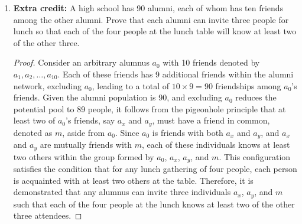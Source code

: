 \documentclass[11pt]{article}
\begin{document}
\begin{enumerate}
    \item {\bf Extra credit:} A high school has 90 alumni, each of whom has ten friends among the other alumni. Prove that each alumni can invite three people for lunch so that each of the four people at the lunch table will know at least two of the other three.

        \begin{proof}
            Consider an arbitrary alumnus \(a_0\) with 10 friends denoted by \(a_1, a_2, \ldots, a_{10}\). Each of these friends has 9 additional friends within the alumni network, excluding \(a_0\), leading to a total of \(10 \times 9 = 90\) friendships among \(a_0\)'s friends. Given the alumni population is 90, and excluding \(a_0\) reduces the potential pool to 89 people, it follows from the pigeonhole principle that at least two of \(a_0\)'s friends, say \(a_x\) and \(a_y\), must have a friend in common, denoted as \(m\), aside from \(a_0\). Since \(a_0\) is friends with both \(a_x\) and \(a_y\), and \(a_x\) and \(a_y\) are mutually friends with \(m\), each of these individuals knows at least two others within the group formed by \(a_0\), \(a_x\), \(a_y\), and \(m\). This configuration satisfies the condition that for any lunch gathering of four people, each person is acquainted with at least two others at the table. Therefore, it is demonstrated that any alumnus can invite three individuals \(a_x\), \(a_y\), and \(m\) such that each of the four people at the lunch knows at least two of the other three attendees.
        \end{proof}

\end{enumerate}
\end{document}
